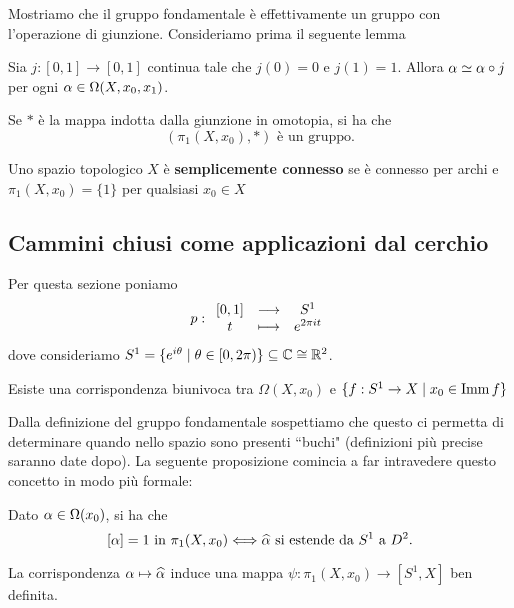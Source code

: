 \begin{multicols*}{2}
\noindent Mostriamo che il gruppo fondamentale è effettivamente un gruppo con l'operazione di giunzione. Consideriamo prima il seguente lemma
\begin{lemma}[Riparametrizzazioni]\label{RiparametrizzazioniRestituisconoCamminiOmotopi}
Sia $j:[0,1]\to[0,1]$ continua tale che $j(0)=0$ e $j(1)=1$. Allora $\alpha\simeq \alpha\circ j$ per ogni $\alpha\in\Omega(X,x_0,x_1)$.
\end{lemma}

\begin{theorem}
Se $\ast$ è la mappa indotta dalla giunzione in omotopia, si ha che
\[(\pi_1(X,x_0),\ast)\text{ è un gruppo.}\]
\end{theorem}

\begin{definition}
Uno spazio topologico $X$ è \textbf{semplicemente connesso} se è connesso per archi e $\pi_1(X,x_0)=\{1\}$ per qualsiasi $x_0\in X$
\end{definition}

\subsection{Cammini chiusi come applicazioni dal cerchio}
Per questa sezione poniamo
\[p:\begin{array}{ccc} {[0,1]} & \longrightarrow & {S^1}\\ {t} & \longmapsto & {e^{2\pi i t}} \end{array}\]
dove consideriamo $S^1=\{e^{i\theta}\mid \theta\in[0,2\pi)\}\subseteq \mathbb{C}\cong\mathbb{R}^2$.
\bigskip
\begin{remark}
Esiste una corrispondenza biunivoca tra $\Omega(X,x_0)$ e $\{f:S^1\to X\mid x_0\in \mathrm{Imm}\, f\}$
\end{remark}

\noindent Dalla definizione del gruppo fondamentale sospettiamo che questo ci permetta di determinare quando nello spazio sono presenti ``buchi" (definizioni più precise saranno date dopo). La seguente proposizione comincia a far intravedere questo concetto in modo più formale:
\begin{proposition}\label{OmotopiaBanaleEEstensioneDalCerchioAlDisco}
Dato $\alpha\in\Omega(x_0)$, si ha che
\[[\alpha]=1\text{ in }\pi_1(X,x_0)\Longleftrightarrow \widehat{\alpha} \text{ si estende da $S^1$ a $D^2$.}\]
\end{proposition}

\begin{proposition}
La corrispondenza $\alpha\mapsto\widehat{\alpha}$ induce una mappa $\psi:\pi_1(X,x_0)\to[S^1,X]$ ben definita.
\end{proposition}


\end{multicols*}

